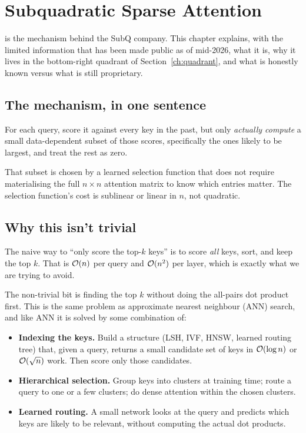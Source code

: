 \section{Subquadratic Sparse Attention}
\label{ch:ssa}

 is the mechanism behind
the SubQ company. This chapter explains, with the limited information
that has been made public as of mid-2026, what it is, why it lives in the
bottom-right quadrant of Section~\ref{ch:quadrant}, and what is honestly
known versus what is still proprietary.

\subsection{The mechanism, in one sentence}

For each query, score it against every key in the past, but only
\emph{actually compute} a small data-dependent subset of those scores,
specifically the ones likely to be largest, and treat the rest as
zero.

That subset is chosen by a learned selection function that does not require
materialising the full \(n \times n\) attention matrix to know which
entries matter. The selection function's cost is sublinear or linear in
\(n\), not quadratic.

\subsection{Why this isn't trivial}

The naive way to ``only score the top-\(k\) keys'' is to score \emph{all}
keys, sort, and keep the top \(k\). That is \(\mathcal{O}(n)\) per query and
\(\mathcal{O}(n^2)\) per layer, which is exactly what we are trying to avoid.

The non-trivial bit is finding the top \(k\) without doing the all-pairs
dot product first. This is the same problem as approximate nearest
neighbour (ANN) search, and like ANN it is solved by some combination of:
\begin{itemize}
\item \textbf{Indexing the keys.} Build a structure (LSH, IVF, HNSW,
learned routing tree) that, given a query, returns a small candidate set
of keys in $\mathcal{O}(\log n)$ or $\mathcal{O}(\sqrt n)$ work. Then score only
those candidates.
\item \textbf{Hierarchical selection.} Group keys into clusters at training
time; route a query to one or a few clusters; do dense attention within
the chosen clusters.
\item \textbf{Learned routing.} A small network looks at the query and
predicts which keys are likely to be relevant, without computing the
actual dot products.
\end{itemize}

